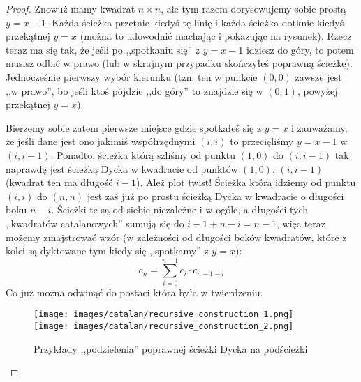 \begin{proof}
	Znowuż mamy kwadrat \(n \times n\), ale tym razem dorysowujemy sobie prostą \(y = x - 1\). Każda ścieżka przetnie kiedyś tę linię i każda ścieżka dotknie kiedyś przekątnej \(y = x\) (można to udowodnić machając i pokazując na rysunek). Rzecz teraz ma się tak, że jeśli po ,,spotkaniu się'' z \(y = x - 1\) idziesz do góry, to potem musisz odbić w prawo (lub w skrajnym przypadku skończyłeś poprawną ścieżkę). Jednocześnie pierwszy wybór kierunku (tzn. ten w punkcie \((0,0)\) zawsze jest ,,w prawo'', bo jeśli ktoś pójdzie ,,do góry'' to znajdzie się w \((0,1)\), powyżej przekątnej \(y = x\)).

	Bierzemy sobie zatem pierwsze miejsce gdzie spotkałeś się z \(y = x\) i zauważamy, że jeśli dane jest ono jakimiś współrzędnymi \((i,i)\) to przecięliśmy \(y = x-1\) w \((i,i-1)\). Ponadto, ścieżka którą szliśmy od punktu \((1,0)\) do \((i,i-1)\) tak naprawdę jest ścieżką Dycka w kwadracie od punktów \((1,0)\), \((i, i-1)\) (kwadrat ten ma długość \(i-1\)). Ależ plot twist! Ścieżka którą idziemy od punktu \((i,i)\) do \((n,n)\) jest zaś już po prostu ścieżką Dycka w kwadracie o długości boku \(n-i\). Ścieżki te są od siebie niezależne i w ogóle, a długości tych ,,kwadratów catalanowych'' sumują się do \(i - 1 + n - i = n - 1\), więc teraz możemy zmajstrować wzór (w zależności od długości boków kwadratów, które z kolei są dyktowane tym kiedy się ,,spotkamy'' z \(y = x\)):
	\begin{equation*}
		c_n = \sum_{i = 0}^{n-1} c_i \cdot c_{n-1-i}
	\end{equation*}
	Co już można odwinąć do postaci która była w twierdzeniu.

	\begin{figure}[H]
		\centering
		\texttt{[image: images/catalan/recursive\_construction\_1.png]}
		\texttt{[image: images/catalan/recursive\_construction\_2.png]}

		\caption{Przykłady ,,podzielenia'' poprawnej ścieżki Dycka na podścieżki}
	\end{figure}

\end{proof}
